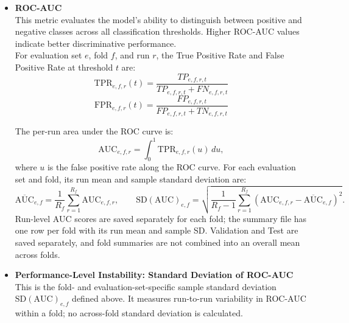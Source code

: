 \documentclass[12pt]{article}
\begin{document}
\begin{itemize}
  As a supplementary probability-fit score, the coefficient of determination is calculated for each run from its predicted probabilities and the binary outcomes:
  \[
  R^2_r = 1 - \frac{\sum_{d=1}^{D}(y_d-\hat{p}^{(r)}_d)^2}{\sum_{d=1}^{D}(y_d-\bar{y})^2},
  \]
  where $\bar{y}$ is the observed outcome prevalence in the evaluated fold. For binary outcomes, this is equivalent to the Brier skill score relative to a baseline that predicts the fold's prevalence for every defendant. It is an outcome-fit score, not a calibration statistic, and can be negative when predictions perform worse than that baseline. The mean and sample standard deviation of the per-run $R^2$ values are shown on each fold's plot; per-run values and fold summaries are also saved. If the observed outcomes have no variation in a fold, $R^2$ is undefined and is reported as such. Calibration is assessed from the reliability curves and their distance from the diagonal.
  
  \item \textbf{ROC-AUC}\\
  \tabto{2em} This metric evaluates the model's ability to distinguish between positive and negative classes across all classification thresholds. Higher ROC-AUC values indicate better discriminative performance.\\

  For evaluation set $e$, fold $f$, and run $r$, the True Positive Rate and False Positive Rate at threshold $t$ are:
  \[ \text{TPR}_{e,f,r}(t) = \frac{TP_{e,f,r,t}}{TP_{e,f,r,t} + FN_{e,f,r,t}} \]
  \[ \text{FPR}_{e,f,r}(t) = \frac{FP_{e,f,r,t}}{FP_{e,f,r,t} + TN_{e,f,r,t}} \]

  The per-run area under the ROC curve is:
  \[
  \mathrm{AUC}_{e,f,r}=\int_{0}^{1}\mathrm{TPR}_{e,f,r}(u)\,du,
  \]
  where $u$ is the false positive rate along the ROC curve. For each evaluation set and fold, its run mean and sample standard deviation are:
  \[
  \overline{\mathrm{AUC}}_{e,f}=\frac{1}{R_f}\sum_{r=1}^{R_f}\mathrm{AUC}_{e,f,r},
  \qquad
  \mathrm{SD}(\mathrm{AUC})_{e,f}=
  \sqrt{\frac{1}{R_f-1}\sum_{r=1}^{R_f}
  \left(\mathrm{AUC}_{e,f,r}-\overline{\mathrm{AUC}}_{e,f}\right)^2}.
  \]
  Run-level AUC scores are saved separately for each fold; the summary file has one row per fold with its run mean and sample SD. Validation and Test are saved separately, and fold summaries are not combined into an overall mean across folds.

  \item \textbf{Performance-Level Instability: Standard Deviation of ROC-AUC} \\
  \tabto{2em} This is the fold- and evaluation-set-specific sample standard deviation $\mathrm{SD}(\mathrm{AUC})_{e,f}$ defined above. It measures run-to-run variability in ROC-AUC within a fold; no across-fold standard deviation is calculated.
\end{itemize}
\end{document}
